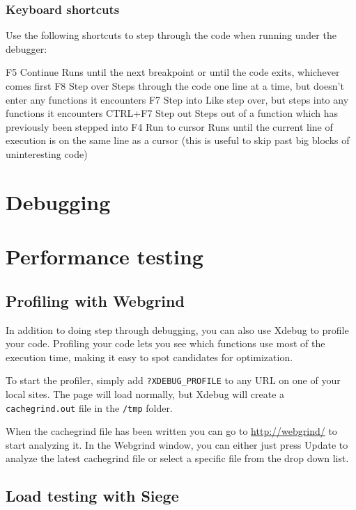 \documentclass[ebook,10pt,twoside,openright]{memoir}
\begin{document}
\subsection{Keyboard shortcuts}

Use the following shortcuts to step through the code when running under the debugger:

F5 	Continue 	Runs until the next breakpoint or until the code exits, whichever comes first
F8 	Step over 	Steps through the code one line at a time, but doesn’t enter any functions it encounters
F7 	Step into 	Like step over, but steps into any functions it encounters
CTRL+F7 	Step out 	Steps out of a function which has previously been stepped into
F4 	Run to cursor 	Runs until the current line of execution is on the same line as a cursor (this is useful to skip past big blocks of uninteresting code)

\chapter{Debugging} \label{chdebugging}

\chapter{Performance testing} \label{chperformance}

\section{Profiling with Webgrind}

In addition to doing step through debugging, you can also use Xdebug to profile your code. Profiling your code lets you see which functions use most of the execution time, making it easy to spot candidates for optimization.

To start the profiler, simply add \verb!?XDEBUG_PROFILE! to any URL on one of your local sites. The page will load normally, but Xdebug will create a \verb!cachegrind.out! file in the \verb!/tmp! folder.

When the cachegrind file has been written you can go to \url{http://webgrind/} to start analyzing it. In the Webgrind window, you can either just press Update to analyze the latest cachegrind file or select a specific file from the drop down list.


\section{Load testing with Siege}
\end{document}
